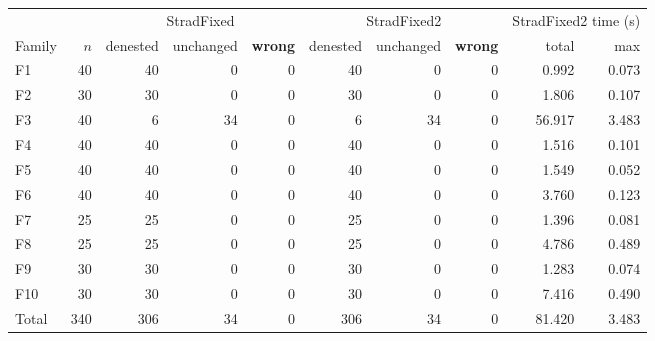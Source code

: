 \begin{tabular}{@{}l r rrr rrr rr@{}}
\toprule
 & & \multicolumn{3}{c}{StradFixed} & \multicolumn{3}{c}{StradFixed2} & \multicolumn{2}{c}{StradFixed2 time (s)}\\
\cmidrule(lr){3-5}\cmidrule(lr){6-8}\cmidrule(lr){9-10}
Family & $n$ & denested & unchanged & \textbf{wrong} & denested & unchanged & \textbf{wrong} & total & max\\\midrule
F1 & 40 & 40 & 0 & 0 & 40 & 0 & 0 & 0.992 & 0.073\\
F2 & 30 & 30 & 0 & 0 & 30 & 0 & 0 & 1.806 & 0.107\\
F3 & 40 & 6 & 34 & 0 & 6 & 34 & 0 & 56.917 & 3.483\\
F4 & 40 & 40 & 0 & 0 & 40 & 0 & 0 & 1.516 & 0.101\\
F5 & 40 & 40 & 0 & 0 & 40 & 0 & 0 & 1.549 & 0.052\\
F6 & 40 & 40 & 0 & 0 & 40 & 0 & 0 & 3.760 & 0.123\\
F7 & 25 & 25 & 0 & 0 & 25 & 0 & 0 & 1.396 & 0.081\\
F8 & 25 & 25 & 0 & 0 & 25 & 0 & 0 & 4.786 & 0.489\\
F9 & 30 & 30 & 0 & 0 & 30 & 0 & 0 & 1.283 & 0.074\\
F10 & 30 & 30 & 0 & 0 & 30 & 0 & 0 & 7.416 & 0.490\\
\midrule Total & 340 & 306 & 34 & 0 & 306 & 34 & 0 & 81.420 & 3.483\\
\bottomrule
\end{tabular}